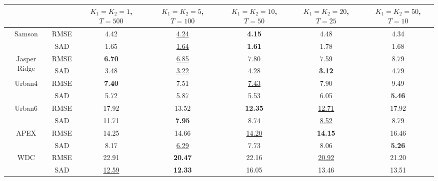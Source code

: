\begin{tabular}{c | c | c c c c c}
  \toprule
  & & $K_1=K_2=1$, $T=500$ & $K_1=K_2=5$, $T=100$  & $K_1=K_2=10$, $T=50$ & $K_1=K_2=20$, $T=25$ & $K_1=K_2=50$, $T=10$ \\
  \hline
  \multirow{2}{*}{Samson}
  & RMSE & 4.42 & \underline{4.24} & \textbf{4.15} & 4.48 & 4.34 \\
  & SAD & 1.65 & \underline{1.64} & \textbf{1.61} & 1.78 & 1.68 \\
  \hline
  \multirow{2}{*}{Jasper Ridge}
  & RMSE & \textbf{6.70} & \underline{6.85} & 7.80 & 7.59 & 8.79 \\
  & SAD & 3.48 & \underline{3.22} & 4.28 & \textbf{3.12} & 4.79 \\
  \hline
  \multirow{2}{*}{Urban4}
  & RMSE & \textbf{7.40} & 7.51 & \underline{7.43} & 7.90 & 9.49 \\
  & SAD & 5.72 & 5.87 & \underline{5.53} & 6.05 & \textbf{5.46} \\
  \hline
  \multirow{2}{*}{Urban6}
  & RMSE & 17.92 & 13.52 & \textbf{12.35} & \underline{12.71} & 17.92 \\
  & SAD & 11.71 & \textbf{7.95} & 8.74 & \underline{8.52} & 8.79 \\
  \hline
  \multirow{2}{*}{APEX}
  & RMSE & 14.25 & 14.66 & \underline{14.20} & \textbf{14.15} & 16.46\\
  & SAD & 8.17 & \underline{6.29} & 7.73 & 8.06 & \textbf{5.26} \\
  \hline
  \multirow{2}{*}{WDC}
  & RMSE & 22.91 & \textbf{20.47} & 22.16 & \underline{20.92} & 21.20 \\
  & SAD & \underline{12.59} & \textbf{12.33} & 16.05 & 13.46 & 13.51 \\

  \bottomrule
\end{tabular}